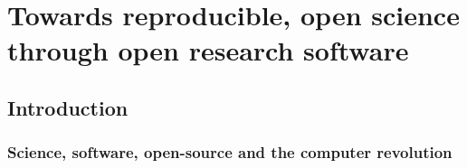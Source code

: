 
\chapter{Towards reproducible, open science through open research software}
\section{Introduction}











\subsection{Science, software, open-source and the computer revolution}

